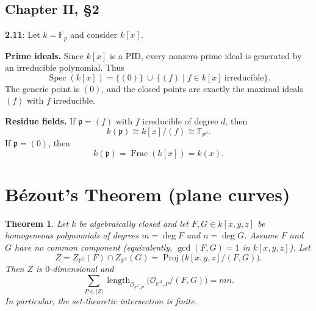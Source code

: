 \documentclass[12pt]{article}
\newtheorem{thm}{Theorem}
\numberwithin{thm}{subsection}
\numberwithin{defn}{subsection}
\numberwithin{lemma}{subsection}
\numberwithin{example}{subsection}
\numberwithin{notation}{subsection}
\numberwithin{cor}{subsection}
\numberwithin{remark}{subsection}
\numberwithin{condition}{subsection}
\numberwithin{question}{subsection}
\numberwithin{construction}{subsection}
\numberwithin{construction}{subsection}
\numberwithin{construction}{subsection}
\newcommand{\bb}[1]{\mathbb{#1}}
\begin{document}
\subsection{Chapter II, \S 2}

\textbf{2.11}:
Let $k=\mathbb F_p$ and consider $k[x]$.

\medskip
\textbf{Prime ideals.}
Since $k[x]$ is a PID, every nonzero prime ideal is generated by an irreducible polynomial.
Thus
\[
\operatorname{Spec}(k[x])=\{(0)\}\ \cup\ \{(f)\mid f\in k[x]\ \text{irreducible}\}.
\]
The generic point is $(0)$, and the closed points are exactly the maximal ideals $(f)$ with $f$ irreducible.

\medskip
\textbf{Residue fields.}
If $\mathfrak p=(f)$ with $f$ irreducible of degree $d$, then
\[
k(\mathfrak p)\cong k[x]/(f)\cong \mathbb F_{p^{d}}.
\]
If $\mathfrak p=(0)$, then
\[
k(\mathfrak p)=\operatorname{Frac}(k[x])=k(x).
\]

\section{B\'ezout's Theorem (plane curves)}
\label{sec:bezout}

\begin{thm}
Let $k$ be algebraically closed and let $F,G\in k[x,y,z]$ be homogeneous polynomials of degrees
$m=\deg F$ and $n=\deg G$. Assume $F$ and $G$ have no common component (equivalently, $\gcd(F,G)=1$ in $k[x,y,z]$).
Let
\[
Z = Z_{\bb{P}^2}(F)\cap Z_{\bb{P}^2}(G)=\operatorname{Proj}\big(k[x,y,z]/(F,G)\big).
\]
Then $Z$ is $0$-dimensional and
\[
\sum_{P\in |Z|}\operatorname{length}_{\mathcal{O}_{\bb{P}^2,P}}\big(\mathcal{O}_{\bb{P}^2,P}/(F,G)\big)=mn.
\]
In particular, the set-theoretic intersection is finite.
\end{thm}
\end{document}
